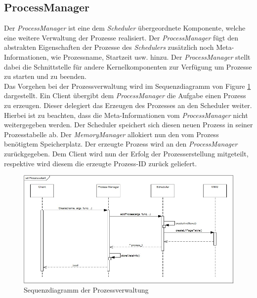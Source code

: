 \subsection{ProcessManager}
\label{secProcessManager}
Der \textit{ProcessManager} ist eine dem \textit{Scheduler} übergeordnete Komponente, welche eine weitere Verwaltung der Prozesse realisiert. Der \textit{ProcessManager} fügt den abstrakten Eigenschaften der Prozesse des \textit{Schedulers} zusätzlich noch Meta-Informationen, wie Prozessname, Startzeit usw. hinzu. Der \textit{ProcessManager} stellt dabei die Schnittstelle für andere Kernelkomponenten zur Verfügung um Prozesse zu starten und zu beenden.\\

Das Vorgehen bei der Prozessverwaltung wird im Sequenzdiagramm von Figure \ref{fig:Sequencediagram} dargestellt. Ein Client übergibt dem \textit{ProcessManager} die Aufgabe einen Prozess zu erzeugen. Dieser delegiert das Erzeugen des Prozesses an den Scheduler weiter. Hierbei ist zu beachten, dass die Meta-Informationen vom \textit{ProcessManager} nicht weitergegeben werden. Der Scheduler speichert sich diesen neuen Prozess in seiner Prozesstabelle ab. Der \textit{MemoryManager} allokiert nun den vom Prozess benötigtem Speicherplatz. Der erzeugte Prozess wird an den \textit{ProcessManager} zurückgegeben. Dem Client wird nun der Erfolg der Prozesserstellung mitgeteilt, respektive wird diesem die erzeugte Prozess-ID zurück geliefert.

\begin{figure}[H]
	\includegraphics[scale=0.70]{chapters/processmanagement/figures/processmanagement-sequence-diagram}
	\caption{Sequenzdiagramm der Prozessverwaltung}
	\label{fig:Sequencediagram}
\end{figure}

\pagebreak 